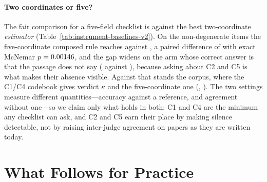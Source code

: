 \documentclass[11pt]{article}
\begin{document}
\paragraph{Two coordinates or five?}
The fair comparison for a five-field checklist is against the best
two-coordinate \emph{estimator} (Table~\ref{tab:instrument-baselines-v2}). On
the non-degenerate items the five-coordinate composed rule reaches
\InsFiveAcc{} against \InsBestTwoAcc{}, a paired difference of
\InsFiveVsTwoDiff{} with exact McNemar $p=0.00146$, and the gap widens on
the arm whose correct answer is that the passage does not say (\InsForceFive{}
against \InsForceTwo{}), because asking about C2 and C5 is what makes their
absence visible. Against that stands the corpus, where the C1/C4 codebook gives
verdict $\kappa$ \AblCFourK{} and the five-coordinate one \AblFiveK{}
(\AblCFourDelta{}, \AblCFourCI{}). The two settings measure different
quantities---accuracy against a reference, and agreement without one---so we
claim only what holds in both: C1 and C4 are the minimum any checklist can ask,
and C2 and C5 earn their place by making silence detectable, not by raising
inter-judge agreement on papers as they are written today.

\section{What Follows for Practice}
\label{sec:practice}
\end{document}

